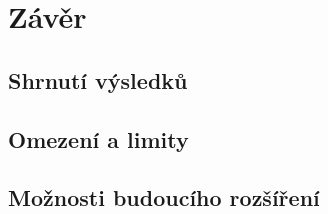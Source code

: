 \chapter*{Závěr}
\section{Shrnutí výsledků}
\section{Omezení a limity}
\section{Možnosti budoucího rozšíření}
